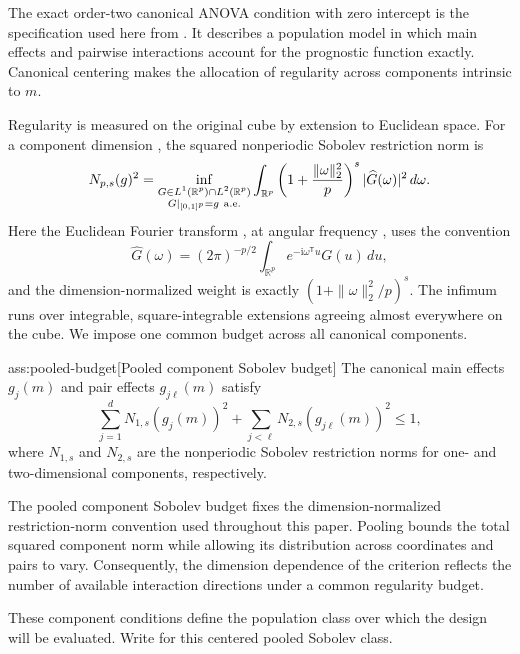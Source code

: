 \documentclass[11pt]{article}
\begin{document}
The exact order-two canonical ANOVA condition with zero intercept is the specification used here from \citep{Cytrynbaum2026Limits}. It describes a population model in which main effects and pairwise interactions account for the prognostic function exactly. Canonical centering makes the allocation of regularity across components intrinsic to \(m\).

Regularity is measured on the original cube by extension to Euclidean space. For a component dimension , the squared nonperiodic Sobolev restriction norm  is
\[
N_{p,s}(g)^2
=
\inf_{\substack{G\in L^1(\mathbb R^p)\cap L^2(\mathbb R^p)\\
G|_{[0,1]^p}=g\ {\rm a.e.}}}
\int_{\mathbb R^p}
\left(1+\frac{\|\omega\|_2^2}{p}\right)^s
|\widehat G(\omega)|^2\,d\omega.
\]
Here the Euclidean Fourier transform , at angular frequency , uses the convention
\[
\widehat G(\omega)
=(2\pi)^{-p/2}\int_{\mathbb R^p}
e^{-\mathrm i\omega^{\mathsf T}u}G(u)\,du,
\]
and the dimension-normalized weight is exactly \((1+\|\omega\|_2^2/p)^s\). The infimum runs over integrable, square-integrable extensions agreeing almost everywhere on the cube. We impose one common budget across all canonical components.

\begin{assumptionv}{ass:pooled-budget}[Pooled component Sobolev budget]
The canonical main effects \(g_j(m)\) and pair effects \(g_{j\ell}(m)\) satisfy
\[
\sum_{j=1}^d N_{1,s}(g_j(m))^2
+\sum_{j<\ell}N_{2,s}(g_{j\ell}(m))^2
\leq 1,
\]
where \(N_{1,s}\) and \(N_{2,s}\) are the nonperiodic Sobolev restriction norms for one- and two-dimensional components, respectively.
\end{assumptionv}

The pooled component Sobolev budget fixes the dimension-normalized restriction-norm convention used throughout this paper. Pooling bounds the total squared component norm while allowing its distribution across coordinates and pairs to vary. Consequently, the dimension dependence of the criterion reflects the number of available interaction directions under a common regularity budget.

These component conditions define the population class over which the design will be evaluated. Write  for this centered pooled Sobolev class.
\end{document}
